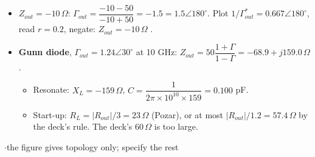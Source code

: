 \begin{itemize}
  \item \textbf{$Z_{out} = -10\,\Omega$}: $\Gamma_{out} = \dfrac{-10 - 50}{-10 + 50} = -1.5 = 1.5\angle180^\circ$.
    Plot $1/\Gamma_{out}^* = 0.667\angle180^\circ$, read $r = 0.2$, negate: $Z_{out} = -10\,\Omega$
    \checkmark.
  \item \textbf{Gunn diode}, $\Gamma_{out} = 1.24\angle30^\circ$ at 10 GHz:
    $Z_{out} = 50\dfrac{1 + \Gamma}{1 - \Gamma} = -68.9 + j159.0\,\Omega$.
  \begin{itemize}
    \item Resonate: $X_L = -159\,\Omega$, $C = \dfrac{1}{2\pi\times10^{10}\times159} = 0.100$ pF.
    \item Start-up: $R_L = |R_{out}|/3 = 23\,\Omega$ (Pozar), or at most
      $|R_{out}|/1.2 = 57.4\,\Omega$ by the deck's rule. The deck's $60\,\Omega$ is too large.
  \end{itemize}
\end{itemize}

\vspace{2pt}

{\color{sub}\footnotesize {} \gap$\cdot$\gap the figure gives topology only; specify the rest}

